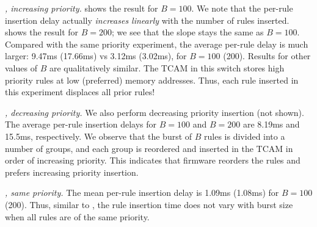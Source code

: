 \emph{\BroadcomOne, increasing priority.}
 shows the result for
$B=100$. We note that the per-rule insertion delay actually {\em
  increases linearly} with the number of
rules inserted. 
shows the result for $B=200$; we see that the slope stays the same as
$B=100$.
Compared with the same priority experiment, the average per-rule
delay is much larger: 9.47ms (17.66ms) vs 3.12ms (3.02ms), for $B=100$ (200). 
Results for other values of $B$ are qualitatively similar. 
The TCAM in this switch stores high priority rules at low (preferred)
memory addresses. Thus, each rule inserted in this experiment
displaces all prior rules!

\emph{\BroadcomOne, decreasing priority.} 
We also perform decreasing priority insertion (not shown). The average 
per-rule insertion delays for $B=100$ and $B=200$ are 8.19ms and 15.5ms, respectively. We observe that the burst of $B$ rules is divided into a number 
of groups, and each group is reordered and inserted in the TCAM in order of increasing priority. 
This indicates that \BroadcomOne firmware reorders the rules and prefers
increasing priority insertion. 

\emph{\BroadcomThree, same priority.} 
The mean per-rule insertion
delay is 1.09ms (1.08ms) for $B=100$ (200). Thus, similar to \BroadcomOne,
the rule insertion time does not vary with burst size when all rules are of
the same priority. 

